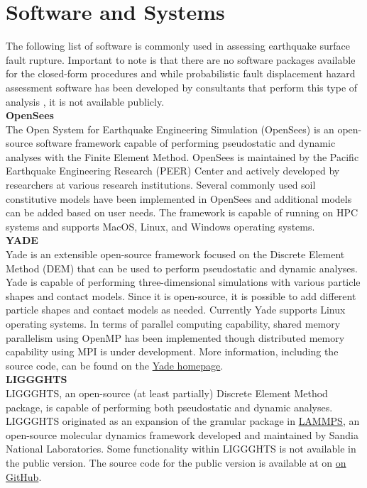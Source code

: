 \section{Software and Systems}
\label{sec:eq_surface_rup_tools}

The following list of software is commonly used in assessing earthquake surface fault rupture. Important to note is that there are no software packages available for the closed-form procedures and while probabilistic fault displacement hazard assessment software has been developed by consultants that perform this type of analysis \citep{wells2014probabilistic}, it is not available publicly.\\

\noindent\textbf{OpenSees}\\
The Open System for Earthquake Engineering Simulation (OpenSees) is an open-source software framework capable of performing pseudostatic and dynamic analyses with the Finite Element Method. OpenSees is maintained by the Pacific Earthquake Engineering Research (PEER) Center and actively developed by researchers at various research institutions. Several commonly used soil constitutive models have been implemented in OpenSees and additional models can be added based on user needs. The framework is capable of running on HPC systems and supports MacOS, Linux, and Windows operating systems.\\

\noindent\textbf{YADE}\\
Yade is an extensible open-source framework focused on the Discrete Element Method (DEM)\citep{yade2005doc} that can be used to perform pseudostatic and dynamic analyses. Yade is capable of performing three-dimensional simulations with various particle shapes and contact models. Since it is open-source, it is possible to add different particle shapes and contact models as needed. Currently Yade supports Linux operating systems. In terms of parallel computing capability, shared memory parallelism using OpenMP has been implemented though distributed memory capability using MPI is under development. More information, including the source code, can be found on the \href{https://yade-dem.org/doc/}{Yade homepage}.\\

\noindent\textbf{LIGGGHTS}\\
LIGGGHTS, an open-source (at least partially) Discrete Element Method package, is capable of performing both pseudostatic and dynamic analyses. LIGGGHTS originated as an expansion of the granular package in \href{https://lammps.sandia.gov/}{LAMMPS}, an open-source molecular dynamics framework developed and maintained by Sandia National Laboratories. Some functionality within LIGGGHTS is not available in the public version. The source code for the public version is available at on \href{https://github.com/CFDEMproject/LIGGGHTS-PUBLIC}{on GitHub}.\\

